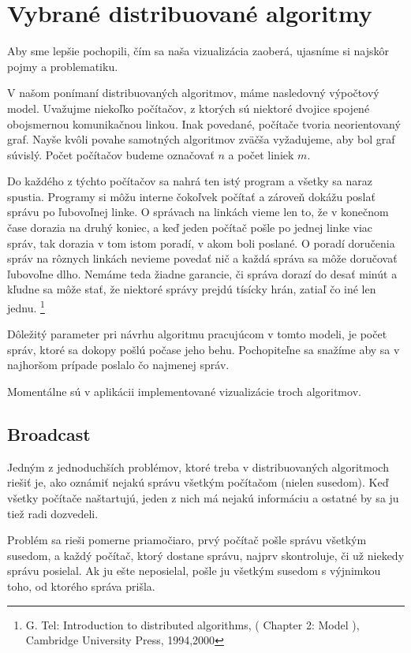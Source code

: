 \section{Vybrané distribuované algoritmy}
Aby sme lepšie pochopili, čím sa naša vizualizácia zaoberá, ujasníme si najskôr pojmy a problematiku.

V našom ponímaní distribuovaných algoritmov, máme nasledovný výpočtový model.
Uvažujme niekoľko počítačov, z ktorých sú niektoré dvojice spojené obojsmernou komunikačnou linkou.
Inak povedané, počítače tvoria neorientovaný graf. Nayše kvôli povahe samotných algoritmov zväčša vyžadujeme,
aby bol graf súvislý. Počet počítačov budeme označovať $n$ a počet liniek $m$.

Do každého z týchto počítačov sa nahrá ten istý program a všetky sa naraz spustia. Programy si môžu
interne čokoľvek počítať a zároveň dokážu poslať správu po ľubovoľnej linke. O správach na linkách
vieme len to, že v konečnom čase dorazia na druhý koniec, a keď jeden počítač pošle po jednej linke
viac správ, tak dorazia v tom istom poradí, v akom boli poslané. O poradí doručenia správ na rôznych
linkách nevieme povedať nič a každá správa sa môže doručovať ľubovoľne dlho. Nemáme teda žiadne garancie, či
správa dorazí do desať minút a kľudne sa môže stať, že niektoré správy prejdú tísícky hrán, zatiaľ čo
iné len jednu.
\footnote{G. Tel: Introduction to distributed algorithms, ( Chapter 2: Model ), Cambridge University
Press, 1994,2000}

Dôležitý parameter pri návrhu algoritmu pracujúcom v tomto modeli, je počet správ, ktoré sa dokopy
pošlú počase jeho behu. Pochopiteľne sa snažíme aby sa v najhoršom prípade poslalo čo najmenej
správ.

Momentálne sú v aplikácii implementované vizualizácie troch algoritmov.

\subsection{Broadcast}

Jedným z jednoduchších problémov, ktoré treba v distribuovaných algoritmoch riešiť je, ako 
oznámiť nejakú správu všetkým počítačom (nielen susedom). Keď všetky počítače naštartujú, 
jeden z nich má nejakú informáciu a ostatné by sa ju tiež radi dozvedeli.

Problém sa rieši pomerne priamočiaro, prvý počítač pošle správu všetkým susedom, a každý
počítač, ktorý dostane správu, najprv skontroluje, či už niekedy správu posielal. 
Ak ju ešte neposielal, pošle ju všetkým susedom s výjnimkou toho, od ktorého správa prišla.

